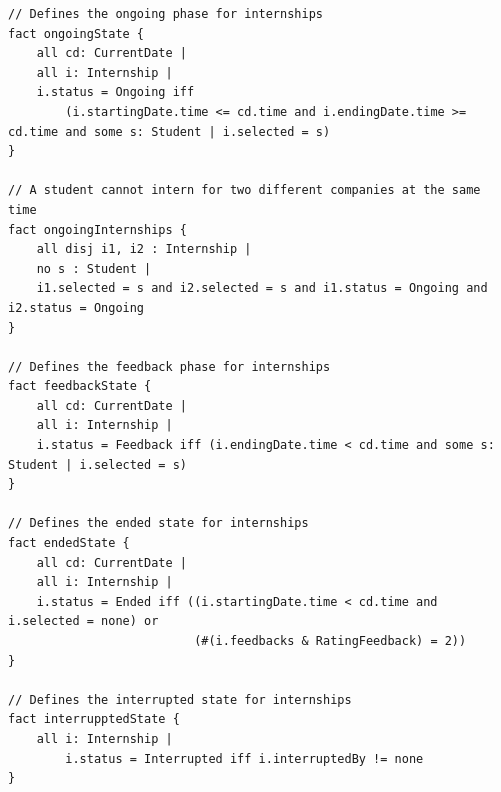 \documentclass[a4paper,12pt]{article}
\begin{document}
\begin{lstlisting}
// Defines the ongoing phase for internships
fact ongoingState {
    all cd: CurrentDate |
    all i: Internship |
    i.status = Ongoing iff 
        (i.startingDate.time <= cd.time and i.endingDate.time >= cd.time and some s: Student | i.selected = s)
}

// A student cannot intern for two different companies at the same time
fact ongoingInternships {
    all disj i1, i2 : Internship |
    no s : Student | 
    i1.selected = s and i2.selected = s and i1.status = Ongoing and i2.status = Ongoing
}

// Defines the feedback phase for internships
fact feedbackState {
    all cd: CurrentDate |
    all i: Internship |
    i.status = Feedback iff (i.endingDate.time < cd.time and some s: Student | i.selected = s)
}

// Defines the ended state for internships
fact endedState {
    all cd: CurrentDate |
    all i: Internship | 
    i.status = Ended iff ((i.startingDate.time < cd.time and i.selected = none) or 
                          (#(i.feedbacks & RatingFeedback) = 2))
}

// Defines the interrupted state for internships
fact interrupptedState {
    all i: Internship | 
        i.status = Interrupted iff i.interruptedBy != none 
}
\end{lstlisting}
\end{document}
